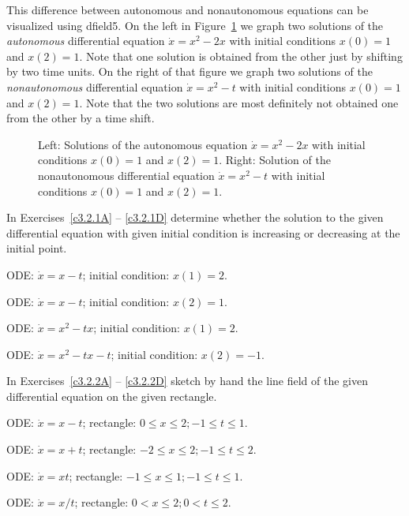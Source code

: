 This difference between autonomous and nonautonomous equations can be
visualized using {\sf dfield5}. On the left in Figure~\ref{F:non-auto}
we graph two solutions of the {\em autonomous\/} differential equation
$\dot{x}=x^2-2x$ with initial conditions $x(0)=1$ and $x(2)=1$.  Note
that one solution is obtained from the other just by shifting by two
time units.  On the right of that figure we graph two solutions of the
{\em nonautonomous\/} differential equation $\dot{x}=x^2-t$ with
initial conditions $x(0)=1$ and $x(2)=1$.  Note that the two solutions
are most definitely not obtained one from the other by a time shift.

\begin{figure}[htb]
        \centerline{%
	}
        \caption{Left: Solutions of the autonomous equation $\dot{x}=x^2-2x$
	with initial conditions $x(0)=1$ and $x(2)=1$. Right: Solution of
	the nonautonomous differential equation $\dot{x}=x^2-t$ with initial
	conditions $x(0)=1$ and $x(2)=1$.}
        \label{F:non-auto}
\end{figure}


\EXER

\TEXER

\noindent In Exercises~\ref{c3.2.1A} -- \ref{c3.2.1D} determine whether the 
solution to the given differential equation with given initial condition is 
increasing or decreasing at the initial point.
\begin{exercise} \label{c3.2.1A}
ODE: $\dot{x}=x-t$; initial condition: $x(1)=2$.
\end{exercise}
\begin{exercise} \label{c3.2.1B}
ODE: $\dot{x}=x-t$; initial condition: $x(2)=1$.
\end{exercise}
\begin{exercise} \label{c3.2.1C}
ODE: $\dot{x}=x^2-tx$; initial condition: $x(1)=2$.
\end{exercise}
\begin{exercise} \label{c3.2.1D}
ODE: $\dot{x}=x^2-tx-t$; initial condition: $x(2)=-1$.
\end{exercise}

\noindent In Exercises~\ref{c3.2.2A} -- \ref{c3.2.2D} sketch by hand the line 
field of the given differential equation on the given rectangle.
\begin{exercise} \label{c3.2.2A}
ODE: $\dot{x}=x-t$; rectangle: $0\leq x\leq 2; -1\leq t\leq 1$.
\end{exercise}
\begin{exercise} \label{c3.2.2B}
ODE: $\dot{x}=x+t$; rectangle: $-2\leq x\leq 2; -1\leq t\leq 2$.
\end{exercise}
\begin{exercise} \label{c3.2.2C}
ODE: $\dot{x}=xt$; rectangle: $-1\leq x\leq 1; -1\leq t\leq 1$.
\end{exercise}
\begin{exercise} \label{c3.2.2D}
ODE: $\dot{x}=x/t$; rectangle: $0< x\leq 2; 0< t\leq 2$.
\end{exercise}

